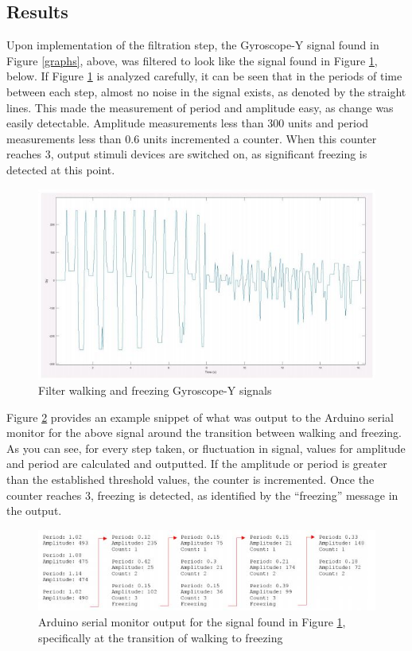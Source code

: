 \documentclass[titlepage]{article}
\begin{document}
\begin{doublespacing}
\clearpage
\section{Results}

Upon implementation of the filtration step, the Gyroscope-Y signal found in Figure \ref{graphs}, above, was filtered to look like the signal found in Figure \ref{filtered}, below. If Figure \ref{filtered} is analyzed carefully, it can be seen that in the periods of time between each step, almost no noise in the signal exists, as denoted by the straight lines. This made the measurement of period and amplitude easy, as change was easily detectable. Amplitude measurements less than 300 units and period measurements less than 0.6 units incremented a counter. When this counter reaches 3, output stimuli devices are switched on, as significant freezing is detected at this point.

\begin{figure}[H]
	\includegraphics[width=\linewidth]{filtered}
	\caption{Filter walking and freezing Gyroscope-Y signals}
	\label{filtered}
\end{figure}

Figure \ref{serial} provides an example snippet of what was output to the Arduino serial monitor for the above signal around the transition between walking and freezing. As you can see, for every step taken, or fluctuation in signal, values for amplitude and period are calculated and outputted. If the amplitude or period is greater than the established threshold values, the counter is incremented. Once the counter reaches 3, freezing is detected, as identified by the “freezing” message in the output.

\begin{figure}[H]
	\includegraphics[width=\linewidth]{serial}
	\caption{Arduino serial monitor output for the signal found in Figure \ref{filtered}, specifically at the transition of walking to freezing}
	\label{serial}
\end{figure}


\end{doublespacing}
\end{document}
